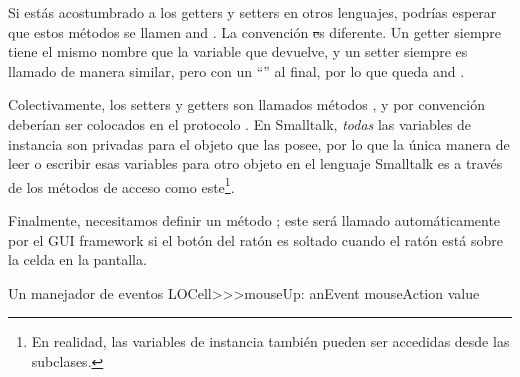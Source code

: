 \documentclass[a4paper,10pt,twoside]{book}
\begin{document}
Si est\'as acostumbrado a los getters y setters en otros lenguajes, podr\'ias esperar que estos m\'etodos se  llamen  and .
La convenci\'on \st es diferente. 
Un getter siempre tiene el mismo nombre que la variable que devuelve, y un setter siempre es llamado de manera similar, pero con un ``\ct{:}'' al final, por lo que queda  and .

Colectivamente, los setters y getters son llamados m\'etodos , y por convenci\'on deber\'ian ser colocados en el protocolo .
En Smalltalk, \emph{todas} las variables de instancia son privadas para el objeto que las posee, por lo que la \'unica manera de leer o escribir esas variables para otro objeto en el lenguaje Smalltalk es a trav\'es de los m\'etodos de acceso como este\footnote{En realidad, las variables de instancia tambi\'en pueden ser accedidas desde las subclases.}.


Finalmente, necesitamos definir un m\'etodo ; este ser\'a llamado autom\'aticamente por el GUI framework  si el bot\'on del rat\'on es soltado cuando el rat\'on est\'a sobre la celda en la pantalla.

\begin{method}[sbecellmouseup]{Un manejador de eventos}
LOCell>>>mouseUp: anEvent
   mouseAction value
\end{method}
\end{document}
